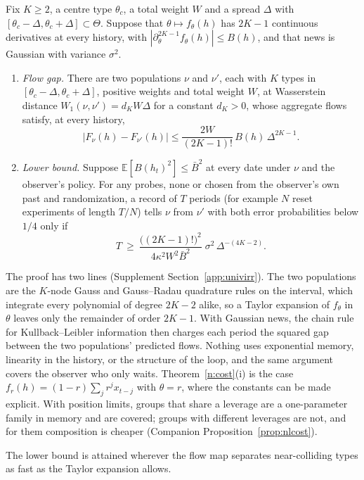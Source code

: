 \begin{theorem}\label{n:univ}
Fix $K\ge2$, a centre type $\theta_c$, a total weight $W$ and a spread $\Delta$ with $[\theta_c-\Delta,\theta_c+\Delta]\subset\Theta$. Suppose that $\theta\mapsto f_\theta(h)$ has $2K-1$ continuous derivatives at every history, with $|\partial_\theta^{2K-1}f_\theta(h)|\le B(h)$, and that news is Gaussian with variance $\sigma^2$.
\begin{enumerate}[label=(\roman*),itemsep=1pt]
\item \emph{Flow gap.} There are two populations $\nu$ and $\nu'$, each with $K$ types in $[\theta_c-\Delta,\theta_c+\Delta]$, positive weights and total weight $W$, at Wasserstein distance $W_1(\nu,\nu')=d_KW\Delta$ for a constant $d_K>0$, whose aggregate flows satisfy, at every history,
\[
|F_\nu(h)-F_{\nu'}(h)|\le\frac{2W}{(2K-1)!}\,B(h)\,\Delta^{2K-1}.
\]
\item \emph{Lower bound.} Suppose $\mathbb E[B(h_t)^2]\le\bar B^2$ at every date under $\nu$ and the observer's policy. For any probes, none or chosen from the observer's own past and randomization, a record of $T$ periods (for example $N$ reset experiments of length $T/N$) tells $\nu$ from $\nu'$ with both error probabilities below $1/4$ only if
\[
T\ \ge\ \frac{\big((2K-1)!\big)^2}{4\kappa^2W^2\bar B^2}\;\sigma^2\,\Delta^{-(4K-2)}.
\]
\end{enumerate}
\end{theorem}

The proof has two lines (Supplement Section~\ref{app:univirr}). The two populations are the $K$-node Gauss and Gauss--Radau quadrature rules on the interval, which integrate every polynomial of degree $2K-2$ alike, so a Taylor expansion of $f_\theta$ in $\theta$ leaves only the remainder of order $2K-1$. With Gaussian news, the chain rule for Kullback--Leibler information then charges each period the squared gap between the two populations' predicted flows. Nothing uses exponential memory, linearity in the history, or the structure of the loop, and the same argument covers the observer who only waits. Theorem~\ref{n:cost}(i) is the case $f_r(h)=(1-r)\sum_jr^jx_{t-j}$ with $\theta=r$, where the constants can be made explicit. With position limits, groups that share a leverage are a one-parameter family in memory and are covered; groups with different leverages are not, and for them composition is cheaper (Companion Proposition~\ref{prop:nlcost}).

The lower bound is attained wherever the flow map separates near-colliding types as fast as the Taylor expansion allows.


